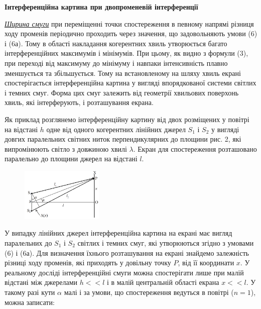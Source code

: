 \documentclass[12pt,a4paper]{article}
\begin{document}
    \begin{center} \textbf{Інтерференційна картина при двопроменевій інтерференції} \end{center}

    \textit{\underline{Ширина смуги}} при переміщенні точки спостереження в певному напрямі різниця ходу променів періодично проходить через значення,
    що задовольняють умови (6) і (6а). Тому в області накладання когерентних хвиль утворюється багато інтерференційних максимумів і мінімумів.
    При цьому, як видно з формули (3), при переході від максимуму до мінімуму і навпаки інтенсивність плавно зменшується та збільшується.
    Тому на встановленому на шляху хвиль екрані спостерігається інтерференційна картина у вигляді впорядкованої системи світлих і темних смуг.
    Форма цих смуг залежить від геометрії хвильових поверхонь хвиль, які інтерферують, і розташування екрана.

    Як приклад розглянемо інтерференційну картину від двох розміщених 
    у повітрі на відстані $h$ одне від одного когерентних лінійних джерел
    $S_1$ і $S_2$ у вигляді довгих паралельних світних ниток перпендикулярних
    до площини рис. 2, які випромінюють світло з довжиною хвилі $\lambda$.
    Екран для спостереження розташовано паралельно до площини джерел на відстані $l$.

    \begin{figure}[!ht]

        \renewcommand{\thefigure}{\arabic{figure}} %

        \centering
        \includegraphics[width=0.35\textwidth]{2.png}
        \caption{}
        \label{fig2:schema}

    \end{figure}

    У випадку лінійних джерел інтерференційна картина на екрані має вигляд паралельних до
    $S_1$ і $S_2$ світлих і темних смуг, які утворюються згідно з
    умовами (6) і (6а). Для визначення їхнього розташування на екрані знайдемо залежність різниці ходу променів,
    які приходять у довільну точку $P$, від її координати $x$.
    У реальному досліді інтерференційні смуги можна спостерігати лише при малій відстані між джерелами
    $h << l$ і в малій центральній області екрана $x << l$. У такому разі кути
    $\alpha$ малі і за умови, що спостереження ведуться в повітрі ($n = 1$), можна записати:
\end{document}
